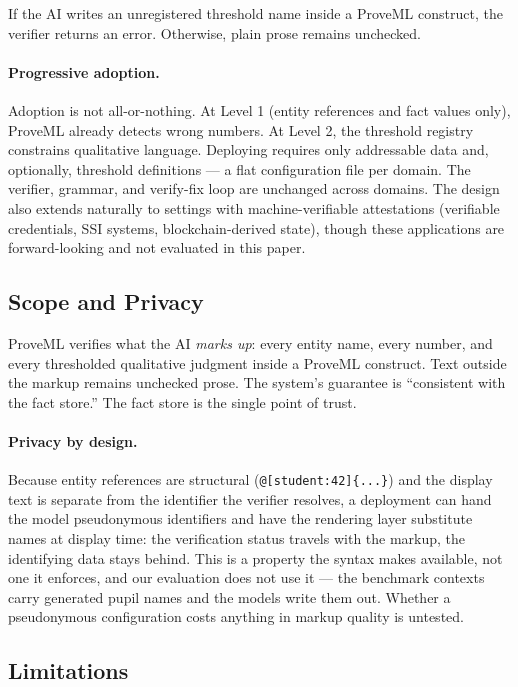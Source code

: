 \documentclass[11pt,a4paper]{article}
\begin{document}
\noindent If the AI writes an unregistered threshold name inside a ProveML construct, the verifier returns an error. Otherwise, plain prose remains unchecked.

\paragraph{Progressive adoption.} Adoption is not all-or-nothing. At Level 1 (entity references and fact values only), ProveML already detects wrong numbers. At Level 2, the threshold registry constrains qualitative language. Deploying requires only addressable data and, optionally, threshold definitions --- a flat configuration file per domain. The verifier, grammar, and verify-fix loop are unchanged across domains. The design also extends naturally to settings with machine-verifiable attestations (verifiable credentials, SSI systems, blockchain-derived state), though these applications are forward-looking and not evaluated in this paper.

\subsection{Scope and Privacy}

ProveML verifies what the AI \textit{marks up}: every entity name, every number, and every thresholded qualitative judgment inside a ProveML construct. Text outside the markup remains unchecked prose. The system's guarantee is ``consistent with the fact store.'' The fact store is the single point of trust.

\paragraph{Privacy by design.} Because entity references are structural (\texttt{@[student:42]\{...\}}) and the display text is separate from the identifier the verifier resolves, a deployment can hand the model pseudonymous identifiers and have the rendering layer substitute names at display time: the verification status travels with the markup, the identifying data stays behind. This is a property the syntax makes available, not one it enforces, and our evaluation does not use it --- the benchmark contexts carry generated pupil names and the models write them out. Whether a pseudonymous configuration costs anything in markup quality is untested.

\subsection{Limitations}
\label{sec:limitations}
\end{document}
